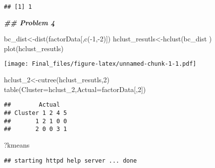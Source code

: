 \documentclass[
]{article}
\newenvironment{Shaded}{\begin{snugshade}}{\end{snugshade}}
\newcommand{\AttributeTok}[1]{\textcolor[rgb]{0.77,0.63,0.00}{#1}}
\newcommand{\DecValTok}[1]{\textcolor[rgb]{0.00,0.00,0.81}{#1}}
\newcommand{\DocumentationTok}[1]{\textcolor[rgb]{0.56,0.35,0.01}{\textbf{\textit{#1}}}}
\newcommand{\FunctionTok}[1]{\textcolor[rgb]{0.00,0.00,0.00}{#1}}
\newcommand{\NormalTok}[1]{#1}
\newcommand{\OtherTok}[1]{\textcolor[rgb]{0.56,0.35,0.01}{#1}}
\newcommand{\SpecialCharTok}[1]{\textcolor[rgb]{0.00,0.00,0.00}{#1}}
\begin{document}
\begin{verbatim}
## [1] 1
\end{verbatim}

\begin{Shaded}
\begin{Highlighting}[]
\DocumentationTok{\#\# Problem 4}

\NormalTok{bc\_dist}\OtherTok{\textless{}{-}}\FunctionTok{dist}\NormalTok{(factorData[,}\FunctionTok{c}\NormalTok{(}\SpecialCharTok{{-}}\DecValTok{1}\NormalTok{,}\SpecialCharTok{{-}}\DecValTok{2}\NormalTok{)])}
\NormalTok{hclust\_resutls}\OtherTok{\textless{}{-}}\FunctionTok{hclust}\NormalTok{(bc\_dist )}
\FunctionTok{plot}\NormalTok{(hclust\_resutls)}
\end{Highlighting}
\end{Shaded}

\texttt{[image: Final\_files/figure-latex/unnamed-chunk-1-1.pdf]}

\begin{Shaded}
\begin{Highlighting}[]
\NormalTok{hclust\_2}\OtherTok{\textless{}{-}}\FunctionTok{cutree}\NormalTok{(hclust\_resutls,}\DecValTok{2}\NormalTok{)}
\FunctionTok{table}\NormalTok{(}\AttributeTok{Cluster=}\NormalTok{hclust\_2,}\AttributeTok{Actual=}\NormalTok{factorData[,}\DecValTok{2}\NormalTok{])}
\end{Highlighting}
\end{Shaded}

\begin{verbatim}
##        Actual
## Cluster 1 2 4 5
##       1 2 1 0 0
##       2 0 0 3 1
\end{verbatim}

\begin{Shaded}
\begin{Highlighting}[]
\NormalTok{?kmeans}
\end{Highlighting}
\end{Shaded}

\begin{verbatim}
## starting httpd help server ... done
\end{verbatim}

\begin{Shaded}
\end{Shaded}
\end{document}
